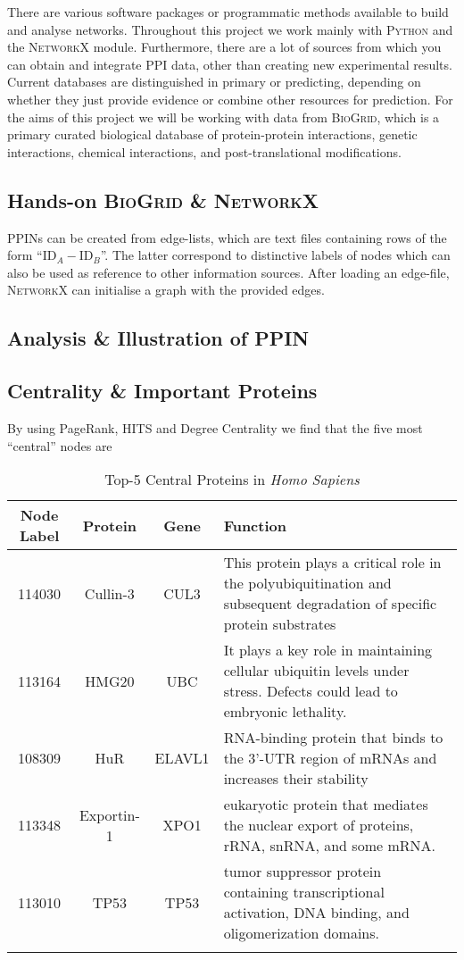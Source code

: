 \label{sec:2-task1}
There are various software packages or programmatic methods available to build and analyse networks. Throughout this project we work mainly with \textsc{Python} and the \textsc{NetworkX} module. Furthermore, there are a lot of sources from which you can obtain and integrate PPI data, other than creating new experimental results. Current databases are distinguished in primary or predicting, depending on whether they just provide evidence or combine other resources for prediction. For the aims of this project we will be working with data from \textsc{BioGrid}, which is a primary curated biological database of protein-protein interactions, genetic interactions, chemical interactions, and post-translational modifications.

\subsection{Hands-on \textsc{BioGrid} \& \textsc{NetworkX}}

PPINs can be created from edge-lists, which are text files containing rows of the form ``$\text{ID}_A - \text{ID}_B$''. The latter correspond to distinctive labels of nodes which can also be used as reference  to other information sources. After loading an edge-file, \textsc{NetworkX} can initialise a graph with the provided edges.

\subsection{Analysis \& Illustration of PPIN}


\subsection{Centrality \& Important Proteins}
By using PageRank, HITS and Degree Centrality we find that the five most ``central'' nodes are

\begin{table}[h]%
	\centering
	\caption{Top-5 Central Proteins in \textit{Homo Sapiens}}
	\begin{tabular}{cccl}
		Node Label & Protein & Gene & Function \\
		\midrule
		114030 & Cullin-3 & CUL3 & This protein plays a critical role in the polyubiquitination and subsequent degradation of specific protein substrates \\
		113164 & HMG20 &  UBC & It plays a key role in maintaining cellular ubiquitin levels under stress. Defects could lead to embryonic lethality. \\
		108309 & HuR & ELAVL1 & RNA-binding protein that binds to the 3'-UTR region of mRNAs and increases their stability \\
		113348 & Exportin-1 & XPO1 &  eukaryotic protein that mediates the nuclear export of proteins, rRNA, snRNA, and some mRNA. \\
		113010 & TP53 & TP53 & tumor suppressor protein containing transcriptional activation, DNA binding, and oligomerization domains.  \\
		\bottomrule
		\label{tab:central}
	\end{tabular}
\end{table}

